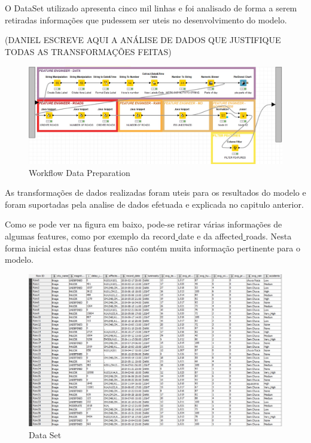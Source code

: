\documentclass[a4paper,10pt]{article}
\begin{document}
O DataSet utilizado apresenta cinco mil linhas e foi analisado de forma a serem retiradas informações que pudessem ser uteis no desenvolvimento do modelo. 
 

(DANIEL ESCREVE AQUI A ANÁLISE DE DADOS QUE JUSTIFIQUE TODAS AS TRANSFORMAÇÕES FEITAS)

\begin{figure} [ h! ]
  \includegraphics[width=\linewidth]{imagens/DATAPREPARATION.jpg}
  \caption{Workflow Data Preparation}
  \label{fig:DATAPREPARATION}
\end{figure}

As transformações de dados realizadas foram uteis para os resultados do modelo e foram suportadas pela analise de dados efetuada e explicada no capitulo anterior. 


Como se pode ver na figura em baixo, pode-se retirar várias informações de algumas features, como por exemplo da record\underline{ }date e da affected\underline{ }roads. Nesta forma inicial estas duas features não contém muita informação pertinente para o modelo. 

\begin{figure} [ h! ]
  \includegraphics[width=\linewidth]{imagens/DATASET.jpg}
  \caption{Data Set}
  \label{fig:DATASET}
\end{figure}
\end{document}
